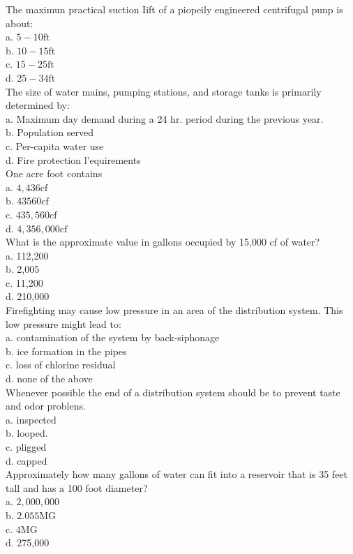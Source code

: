 The maximun practical suction Iift of a piopeily engineered centrifugal punp is about:\\
a. $5-10 \mathrm{ft}$\\
b. $10-15 \mathrm{ft}$\\
c. $15-25 \mathrm{ft}$\\
d. $25-34 \mathrm{ft}$ \\

The size of water mains, pumping stations, and storage tanks is primarily determined by:\\
a. Maximum day demand during a 24 hr. period during the previous year.\\
b. Population served\\
c. Per-capita water use\\
d. Fire protection l'equirements\\

One acre foot contains\\
a. $4,436 \mathrm{cf}$\\
b. $43560 \mathrm{cf}$\\
c. $435,560 \mathrm{cf}$\\
d. $4,356,000 \mathrm{cf}$\\

What is the approximate value in gallons occupied by 15,000 cf of water?\\
a. 112,200\\
b. 2,005\\
c. 11,200\\
d. 210,000\\

Firefighting may cause low pressure in an area of the distribution system. This low pressure might lead to:\\
a. contamination of the system by back-siphonage\\
b. ice formation in the pipes\\
c. loss of chlorine residual\\
d. none of the above\\

Whenever possible the end of a distribution system should be to prevent taste and odor problens.\\
a. inspected\\
b. looped.\\
c. pligged\\
d. capped\\

Approximately how many gallons of water can fit into a reservoir that is 35 feet tall and has a 100 foot diameter?\\
a. $2,000,000$\\
b. $2.055 \mathrm{MG}$\\
c. $4 \mathrm{MG}$\\
d. 275,000\\

